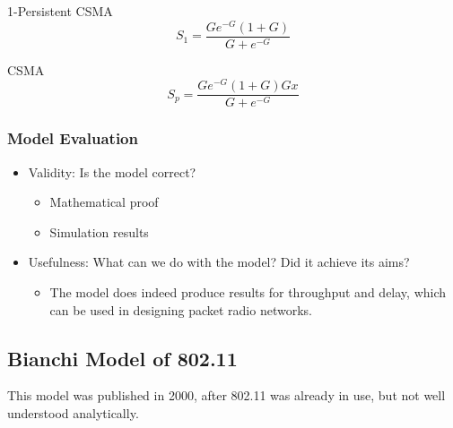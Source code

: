1-Persistent CSMA
\begin{equation}\label{eq:1_Persistent_CSMA_Throughput}
  S_{1} = \frac{G e^{-G} (1+G)}{G + e^{-G}}
\end{equation}

 CSMA
\begin{equation}\label{eq:p_Persistent_CSMA_Throughput}
  S_{p} = \frac{G e^{-G} (1+G) Gx}{G+e^{-G}}
\end{equation}

\subsubsection{Model Evaluation}\label{subsubsec:Kleinrock_Tobagi_Model_Eval}
\begin{itemize}[noitemsep]
\item Validity: Is the model correct?
  \begin{itemize}[noitemsep]
  \item Mathematical proof
  \item Simulation results
  \end{itemize}

\item Usefulness: What can we do with the model? Did it achieve
  its aims?
  \begin{itemize}[noitemsep]
  \item The model does indeed produce results for throughput and delay, which can be used in designing packet radio networks.
  \end{itemize}
\end{itemize}

\subsection{Bianchi Model of 802.11}\label{subsec:Bianchi_Model}
This model was published in 2000, after 802.11 was already in use, but not well understood analytically.

